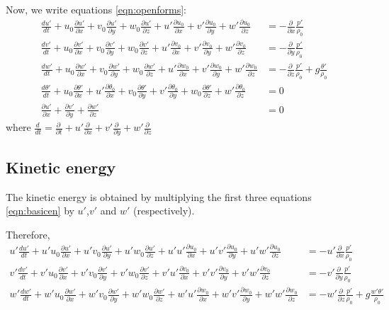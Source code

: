 \documentclass[a4paper,10pt]{article}
\newcommand{\fd}[2]{\frac{d#1}{d#2}}
\newcommand{\pd}[2]{\frac{\partial #1}{\partial #2}}
\newcommand{\Ddtf}[4]{\pd{#1}{t} + #2\pd{#1}{x} + #3\pd{#1}{y} + #4\pd{#1}{z}}
\begin{document}
Now, we write equations \ref{eqn:openforms}: 
\begin{equation}
  \begin{align}
    \fd{u'}{t} + u_0\pd{u'}{x} + v_0\pd{u'}{y} + w_0\pd{u'}{z} + u'\pd{u_0}{x}  + v'\pd{u_0}{y}  + w'\pd{u_0}{z} &= -\pd{\,}{x}\frac{p'}{\rho_0} \\
    \fd{v'}{t} + u_0\pd{v'}{x} + v_0\pd{v'}{y} + w_0\pd{v'}{z} + u'\pd{v_0}{x}  + v'\pd{v_0}{y}  + w'\pd{v_0}{z} &= -\pd{\,}{y}\frac{p'}{\rho_0} \\
    \fd{w'}{t} + u_0\pd{w'}{x} + v_0\pd{w'}{y} + w_0\pd{w'}{z} + u'\pd{w_0}{x}  + v'\pd{w_0}{y}  + w'\pd{w_0}{z} &= -\pd{\,}{z}\frac{p'}{\rho_0} + g\frac{\theta'}{\rho_0}\\
    \fd{\theta'}{t} + u_0\pd{\theta'}{x} + u'\pd{\theta_0}{x} + v_0\pd{\theta'}{y} + v'\pd{\theta_0}{y} + w_0\pd{\theta'}{z} + w'\pd{\theta_0}{z} &= 0\\
    \pd{u'}{x}  + \pd{v'}{y} + \pd{w'}{z} &= 0    
  \end{align}
  \label{eqn:basicen}
\end{equation}
where $\fd{\,}{t} = \Ddtf{\,}{u'}{v'}{w'}$

\subsection{Kinetic energy}

The kinetic energy is obtained by multiplying the first three equations \ref{eqn:basicen} by $u'$,$v'$ and $w'$ (respectively).

Therefore, 
\begin{equation}
  \begin{align}
    u'\fd{u'}{t} + u'u_0\pd{u'}{x} + u'v_0\pd{u'}{y} + u'w_0\pd{u'}{z} + u'u'\pd{u_0}{x}  + u'v'\pd{u_0}{y}  + u'w'\pd{u_0}{z} &= -u'\pd{\,}{x}\frac{p'}{\rho_0} \\
    v'\fd{v'}{t} + v'u_0\pd{v'}{x} + v'v_0\pd{v'}{y} + v'w_0\pd{v'}{z} + v'u'\pd{v_0}{x}  + v'v'\pd{v_0}{y}  + v'w'\pd{v_0}{z} &= -v'\pd{\,}{y}\frac{p'}{\rho_0} \\
    w'\fd{w'}{t} + w'u_0\pd{w'}{x} + w'v_0\pd{w'}{y} + w'w_0\pd{w'}{z} + w'u'\pd{w_0}{x}  + w'v'\pd{w_0}{y}  + w'w'\pd{w_0}{z} &= -w'\pd{\,}{z}\frac{p'}{\rho_0} + g\frac{w'\theta'}{\rho_0}\\
  \end{align}
  \label{eqn:kinet1}
\end{equation}
\end{document}
